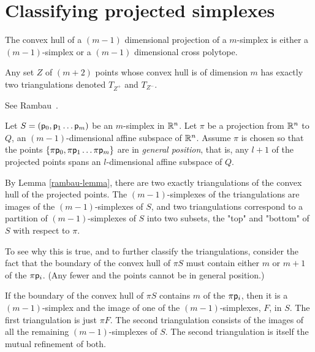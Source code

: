 
\section{Classifying projected simplexes}
\label{sec:classifying}


The convex hull of a $(m-1)$ dimensional projection of a $m$-simplex
is either a $(m-1)$-simplex or a $(m-1)$ dimensional cross polytope.

\begin{Lemma}
\label{rambau-lemma}
Any set $Z$ of $(m+2)$ points whose convex hull is of dimension $m$
has exactly two triangulations denoted $T_{Z^+}$ and $T_{Z^-}$.
\end{Lemma}

See Rambau~\cite[Lemma~1.1.2]{rambau-jorg-1996}.

Let $S=(\mathsf{p}_0, \mathsf{p}_1 \ldots  \mathsf{p}_m)$ be an $m$-simplex in $\mathbb{R}^{n}$.
Let $\pi$ be a projection from $\mathbb{R}^{n}$ to $Q$, an $(m-1)$-dimensional
affine subspace of $\mathbb{R}^{n}$.
Assume $\pi$ is chosen so that the points
$\{\pi \mathsf{p}_0, \pi \mathsf{p}_1 \ldots  \pi \mathsf{p}_m\}$ are in {\it general position},
that is, any $l+1$ of the projected points spans an $l$-dimensional
affine subspace of $Q$.

By Lemma \ref{rambau-lemma},
there are two exactly triangulations of the convex hull of the projected points.
The $(m-1)$-simplexes of the triangulations are images of the $(m-1)$-simplexes of $S$,
and two triangulations correspond to a partition of $(m-1)$-simplexes of $S$
into two subsets, the "top" and "bottom" of $S$ with respect to $\pi$.

To see why this is true, and to further classify the triangulations,
consider the fact that the boundary of the convex hull of $\pi S$
must contain either $m$ or $m+1$ of the $\pi \mathsf{p}_i$.
(Any fewer and the points cannot be in general position.)

\begin{Theorem}
\label{one-simplex-case}
If the boundary of the convex hull of $\pi S$
contains $m$ of the $\pi \mathsf{p}_i$,
then it is a $(m-1)$-simplex
and the image of one of the $(m-1)$-simplexes, $F$, in $S$.
The first triangulation is just $\pi F$.
The second triangulation consists of the images of
all the remaining $(m-1)$-simplexes of $S$.
The second triangulation is itself the mutual refinement of both.
\end{Theorem}

